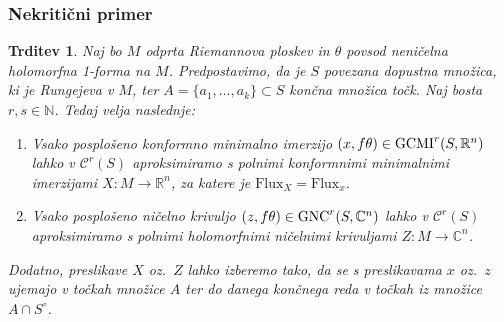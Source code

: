\documentclass[12pt,a4paper,twoside]{article}
\theoremstyle{definition} %
\theoremstyle{plain} %
\newtheorem{trditev}[definicija]{Trditev}
\numberwithin{equation}{section}  %
\newcommand{\R}{\mathbb R}
\newcommand{\N}{\mathbb N}
\newcommand{\C}{\mathbb C}
\begin{document}
\subsubsection{Nekritični primer}
%
\begin{trditev} \label{trd:nekritcni-primer}
Naj bo $M$ odprta Riemannova ploskev in $\theta$ povsod neničelna holomorfna 1-forma na $M$.
Predpostavimo, da je $S$ povezana dopustna množica, ki je Rungejeva v $M$, ter $A=\{a_{1}, \dots , a_{k} \} \subset S$ končna množica točk. Naj bosta $r, s \in \N$. Tedaj velja naslednje:
\begin{enumerate}
\item 
Vsako posplošeno konformno minimalno imerzijo $(x, f\theta) \in \textup{GCMI}^{r}(S,\R^{n})$ lahko v $\mathcal{C}^{r}(S)$ aproksimiramo s polnimi konformnimi minimalnimi imerzijami $X \colon M \to \R^{n}$, za katere je $\text{Flux}_{X} = \text{Flux}_{x}$. 
\item
Vsako posplošeno ničelno krivuljo $(z, f\theta) \in \textup{GNC}^{r}(S,\C^{n})$ lahko v $\mathcal{C}^{r}(S)$ aproksimiramo s polnimi holomorfnimi ničelnimi krivuljami $Z \colon M \to \C^{n}$.
\end{enumerate}
Dodatno, preslikave $X$ oz.~$Z$ lahko izberemo tako, da se s preslikavama $x$ oz.~$z$ ujemajo v točkah množice $A$ ter do danega končnega reda v točkah iz množice $A \cap S^{\circ}$.
\end{trditev}
\end{document}

